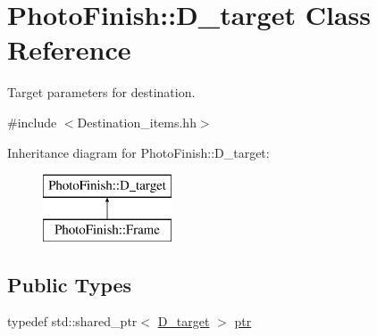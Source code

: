 \hypertarget{class_photo_finish_1_1_d__target}{}\section{Photo\+Finish\+:\+:D\+\_\+target Class Reference}
\label{class_photo_finish_1_1_d__target}


Target parameters for destination.  




{\ttfamily \#include $<$Destination\+\_\+items.\+hh$>$}

Inheritance diagram for Photo\+Finish\+:\+:D\+\_\+target\+:\begin{figure}[H]
\begin{center}
\leavevmode
\includegraphics[height=2.000000cm]{class_photo_finish_1_1_d__target}
\end{center}
\end{figure}
\subsection*{Public Types}
\begin{DoxyCompactItemize}
\item 
typedef std\+::shared\+\_\+ptr$<$ \hyperlink{class_photo_finish_1_1_d__target}{D\+\_\+target} $>$ \hyperlink{class_photo_finish_1_1_d__target_a44befb9c758d25b0c765e97caa1caa39}{ptr}
\end{DoxyCompactItemize}
